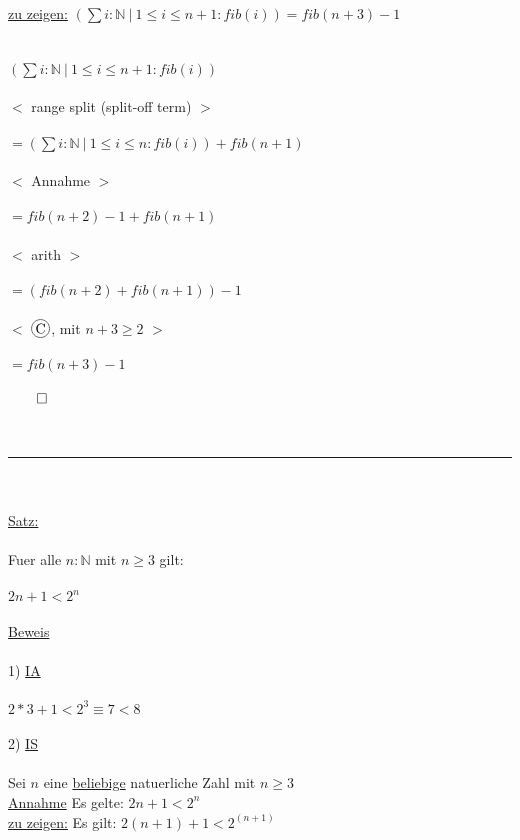 \documentclass[18pt,a4paper]{article}
\newcommand*\circled[1]{\tikz[baseline=(char.base)]{
            \node[shape=circle,draw,inner sep=1pt] (char) {#1};}}
\newcommand{\tab}{\hspace*{2em}}
\begin{document}
\uline{zu zeigen:} $(\sum{i} : \mathbb{N} \:\vert\: 1\leqslant i\leqslant n+1: fib(i)) = fib(n+3) -1$\\
\\
\\
$(\sum{i} : \mathbb{N} \:\vert\: 1\leqslant i\leqslant n +1  : fib(i))$\\
\\
\tab $<$ range split (split-off term) $>$ \\
\\
$= (\sum{i} : \mathbb{N} \:\vert\: 1\leqslant i\leqslant n : fib(i)) + fib(n+1)$\\
\\
\tab $<$ Annahme $>$ \\
\\
$= fib(n+2) -1 + fib(n+1)$\\
\\
\tab $<$ arith $>$\\
\\
$= (fib(n+2) + fib(n+1)) -1$\\
\\
\tab $<$ $\circled{C}$, mit $n+3 \geqslant 2$ $>$ \\
\\
$= fib(n+3) -1 $\\
\\
$\qed$\\
\\
\\
\rule{\textwidth}{0.4mm}\\
\\
\uline{Satz:}\\
\\
Fuer alle $n:\mathbb{N}$ mit $n\geqslant3$ gilt:\\
\\
$2n+1 < 2^n$\\
\\
\uline{Beweis}\\
\\
1) \uline{IA}\\
\\
$2*3 + 1 < 2^3 \equiv 7<8$ \checkmark \\
\\
2) \uline{IS}\\
\\
Sei $n$ eine \uline{beliebige} natuerliche Zahl mit $n\geqslant 3$\\
\uline{Annahme} Es gelte: $2n+1 < 2^n$\\
\uline{zu zeigen:} Es gilt: $2(n+1)+1 < 2^(n+1)$\\
\end{document}

